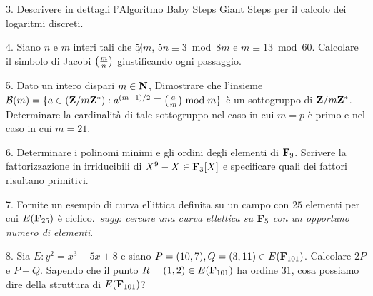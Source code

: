\item{3.} Descrivere in dettagli l'Algoritmo Baby Steps Giant Steps per il calcolo dei logaritmi discreti.\vv

\item{4.} Siano $n$ e $m$ interi tali che $5\not| m$, $5n\equiv 3\bmod 8m$ e $m\equiv 13\bmod 60$. 
          Calcolare il simbolo di Jacobi $\left({m\over n}\right)$ giustificando ogni passaggio.  \ve\vs

\item{5.} Dato un intero dispari $m\in{\bf N}$, Dimostrare che l'insieme ${\cal B}(m)=
\{a\in({\bf Z}/m{\bf Z}^*): a^{(m-1)/2}\equiv \left({a\over m}\right)\bmod m\}$ \`e un sottogruppo di ${\bf Z}/m{\bf Z}^*$.
Determinare la cardinalit\`a di tale sottogruppo nel caso in cui $m=p$ \`e primo e nel caso in cui $m=21$.\vv

\item{6.} Determinare i polinomi minimi e gli ordini degli elementi di ${\bf F}_{9}$. Scrivere la fattorizzazione in irriducibili di 
$X^{9}-X\in{\bf F}_3[X]$ e specificare quali dei fattori risultano primitivi.\ve\vs

\item{7.} Fornite un esempio di curva ellittica definita su un campo con $25$ elementi per cui $E({\bf F}_{25})$ \`e
ciclico.\hfill \break \ \hfill {\it sugg: cercare una curva ellettica su ${\bf F}_{5}$ con un opportuno numero di elementi}.\vv

\item{8.}  Sia $E : y^2 = x^3 - 5x + 8$ e siano $P = (10, 7),Q = (3, 11) \in E({\bf F}_{101})$. Calcolare $2P$ e $P+Q$. Sapendo che 
il punto $R=(1,2)\in E({\bf F}_{101})$ ha ordine $31$, cosa possiamo dire della struttura di $E({\bf F}_{101})$?%

 
\bye
